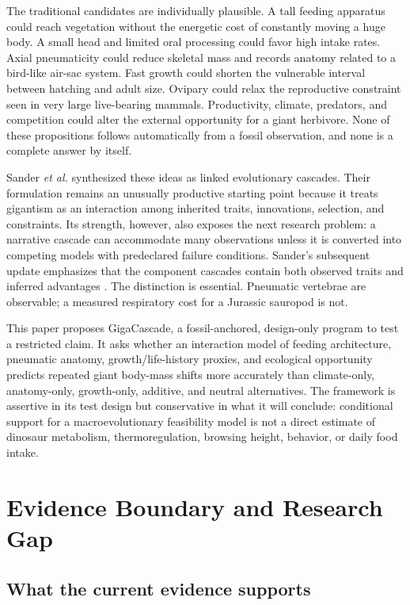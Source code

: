 \documentclass[conference]{IEEEtran}
\newcommand{\gc}{GigaCascade}
\begin{document}
The traditional candidates are individually plausible. A tall feeding apparatus could reach vegetation without the energetic cost of constantly moving a huge body. A small head and limited oral processing could favor high intake rates. Axial pneumaticity could reduce skeletal mass and records anatomy related to a bird-like air-sac system. Fast growth could shorten the vulnerable interval between hatching and adult size. Ovipary could relax the reproductive constraint seen in very large live-bearing mammals. Productivity, climate, predators, and competition could alter the external opportunity for a giant herbivore. None of these propositions follows automatically from a fossil observation, and none is a complete answer by itself.

Sander \emph{et al.} \cite{sander2010} synthesized these ideas as linked evolutionary cascades. Their formulation remains an unusually productive starting point because it treats gigantism as an interaction among inherited traits, innovations, selection, and constraints. Its strength, however, also exposes the next research problem: a narrative cascade can accommodate many observations unless it is converted into competing models with predeclared failure conditions. Sander's subsequent update emphasizes that the component cascades contain both observed traits and inferred advantages \cite{sander2013}. The distinction is essential. Pneumatic vertebrae are observable; a measured respiratory cost for a Jurassic sauropod is not.

This paper proposes \gc, a fossil-anchored, design-only program to test a restricted claim. It asks whether an interaction model of feeding architecture, pneumatic anatomy, growth/life-history proxies, and ecological opportunity predicts repeated giant body-mass shifts more accurately than climate-only, anatomy-only, growth-only, additive, and neutral alternatives. The framework is assertive in its test design but conservative in what it will conclude: conditional support for a macroevolutionary feasibility model is not a direct estimate of dinosaur metabolism, thermoregulation, browsing height, behavior, or daily food intake.

\section{Evidence Boundary and Research Gap}

\subsection{What the current evidence supports}
\end{document}
